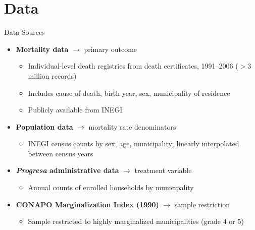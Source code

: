 \documentclass[aspectratio=169,usenames,dvipsnames]{beamer}
\begin{document}

\section{Data}

\begin{frame}{Data Sources}\label{data}
\small
\begin{itemize}
  \item \textbf{Mortality data} $\rightarrow$ primary outcome
    \begin{itemize}
      \item Individual-level death registries from death certificates, 1991--2006 ($>3$ million records)
      \item Includes cause of death, birth year, sex, municipality of residence
      \item Publicly available from INEGI
    \end{itemize}
  \vspace{4pt}
  \item \textbf{Population data} $\rightarrow$ mortality rate denominators
    \begin{itemize}
      \item INEGI census counts by sex, age, municipality; linearly interpolated between census years
    \end{itemize}
  \vspace{4pt}
  \item \textbf{\textit{Progresa} administrative data} $\rightarrow$ treatment variable
    \begin{itemize}
      \item Annual counts of enrolled households by municipality
    \end{itemize}
  \vspace{4pt}
  \item \textbf{CONAPO Marginalization Index (1990)} $\rightarrow$ sample restriction
    \begin{itemize}
      \item Sample restricted to highly marginalized municipalities (grade 4 or 5)
    \end{itemize}

\end{itemize}
\end{frame}
\end{document}
